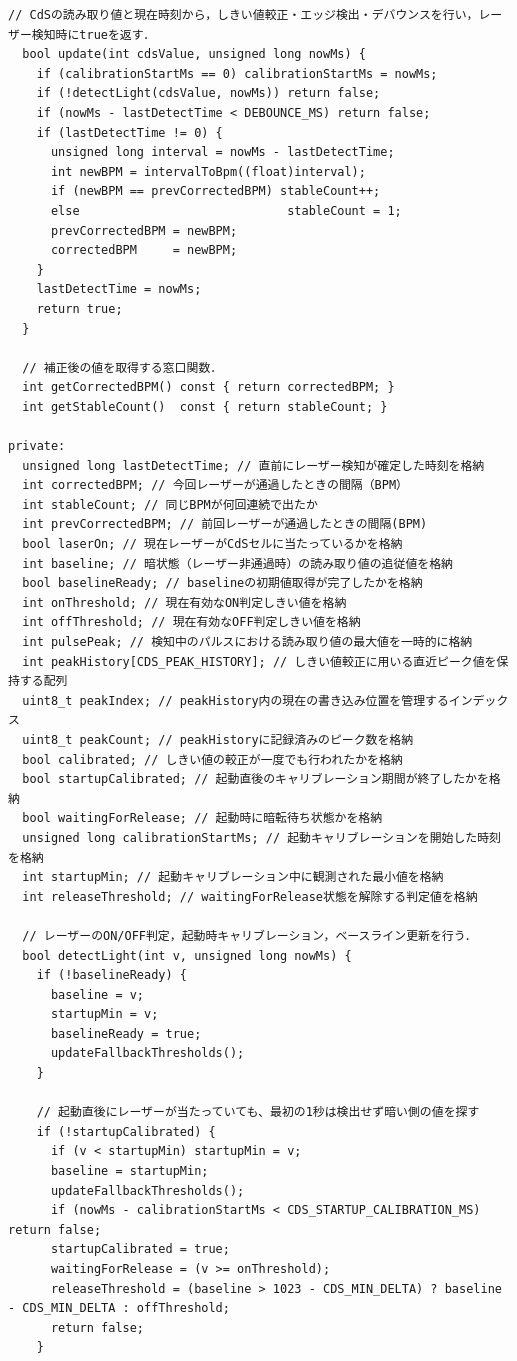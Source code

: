 \begin{lstlisting}[caption={piano\_0706.ino（楽譜データは冒頭2小節のみ掲載）}, label={lst:douki_piano_full}]
  // CdSの読み取り値と現在時刻から，しきい値較正・エッジ検出・デバウンスを行い，レーザー検知時にtrueを返す．
  bool update(int cdsValue, unsigned long nowMs) {
    if (calibrationStartMs == 0) calibrationStartMs = nowMs;
    if (!detectLight(cdsValue, nowMs)) return false;
    if (nowMs - lastDetectTime < DEBOUNCE_MS) return false;
    if (lastDetectTime != 0) {
      unsigned long interval = nowMs - lastDetectTime;
      int newBPM = intervalToBpm((float)interval);
      if (newBPM == prevCorrectedBPM) stableCount++;
      else                             stableCount = 1;
      prevCorrectedBPM = newBPM;
      correctedBPM     = newBPM;
    }
    lastDetectTime = nowMs;
    return true;
  }

  // 補正後の値を取得する窓口関数．
  int getCorrectedBPM() const { return correctedBPM; }
  int getStableCount()  const { return stableCount; }

private:
  unsigned long lastDetectTime; // 直前にレーザー検知が確定した時刻を格納
  int correctedBPM; // 今回レーザーが通過したときの間隔（BPM）
  int stableCount; // 同じBPMが何回連続で出たか
  int prevCorrectedBPM; // 前回レーザーが通過したときの間隔(BPM)
  bool laserOn; // 現在レーザーがCdSセルに当たっているかを格納
  int baseline; // 暗状態（レーザー非通過時）の読み取り値の追従値を格納
  bool baselineReady; // baselineの初期値取得が完了したかを格納
  int onThreshold; // 現在有効なON判定しきい値を格納
  int offThreshold; // 現在有効なOFF判定しきい値を格納
  int pulsePeak; // 検知中のパルスにおける読み取り値の最大値を一時的に格納
  int peakHistory[CDS_PEAK_HISTORY]; // しきい値較正に用いる直近ピーク値を保持する配列
  uint8_t peakIndex; // peakHistory内の現在の書き込み位置を管理するインデックス
  uint8_t peakCount; // peakHistoryに記録済みのピーク数を格納
  bool calibrated; // しきい値の較正が一度でも行われたかを格納
  bool startupCalibrated; // 起動直後のキャリブレーション期間が終了したかを格納
  bool waitingForRelease; // 起動時に暗転待ち状態かを格納
  unsigned long calibrationStartMs; // 起動キャリブレーションを開始した時刻を格納
  int startupMin; // 起動キャリブレーション中に観測された最小値を格納
  int releaseThreshold; // waitingForRelease状態を解除する判定値を格納

  // レーザーのON/OFF判定，起動時キャリブレーション，ベースライン更新を行う．
  bool detectLight(int v, unsigned long nowMs) {
    if (!baselineReady) {
      baseline = v;
      startupMin = v;
      baselineReady = true;
      updateFallbackThresholds();
    }

    // 起動直後にレーザーが当たっていても、最初の1秒は検出せず暗い側の値を探す
    if (!startupCalibrated) {
      if (v < startupMin) startupMin = v;
      baseline = startupMin;
      updateFallbackThresholds();
      if (nowMs - calibrationStartMs < CDS_STARTUP_CALIBRATION_MS) return false;
      startupCalibrated = true;
      waitingForRelease = (v >= onThreshold);
      releaseThreshold = (baseline > 1023 - CDS_MIN_DELTA) ? baseline - CDS_MIN_DELTA : offThreshold;
      return false;
    }


\end{lstlisting}
